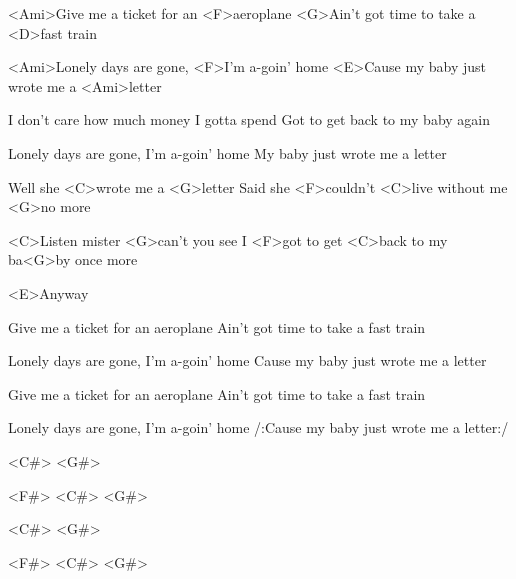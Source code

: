 


\zs
<Ami>Give me a ticket for an <F>aeroplane
<G>Ain't got time to take a <D>fast train

<Ami>Lonely days are gone, <F>I'm a-goin' home
<E>Cause my baby just wrote me a <Ami>letter
\ks


\zs
I don't care how much money I gotta spend
Got to get back to my baby again

Lonely days are gone, I'm a-goin' home
My baby just wrote me a letter
\ks

\zr

Well she <C>wrote me a <G>letter
Said she <F>couldn't <C>live without me <G>no more


<C>Listen mister <G>can't you see
I <F>got to get <C>back to my ba<G>by once more

<E>Anyway
\kr

\zs
Give me a ticket for an aeroplane
Ain't got time to take a fast train

Lonely days are gone, I'm a-goin' home
Cause my baby just wrote me a letter
\ks


\zr\kr


\zs
Give me a ticket for an aeroplane
Ain't got time to take a fast train

Lonely days are gone, I'm a-goin' home
/:Cause my baby just wrote me a letter:/
\ks


<C#>      <G#>

<F#>      <C#>      <G#>

<C#>      <G#>

<F#>      <C#>      <G#>


\kp
